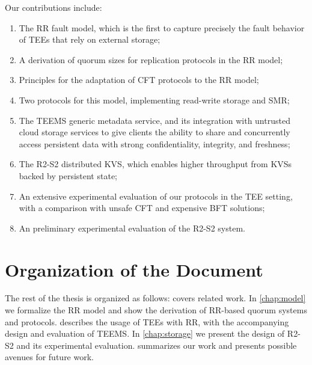 Our contributions include:
\begin{enumerate}
    \item The \ac{RR} fault model, which is the first to capture
        precisely the fault behavior of \acp{TEE} that rely on external storage;
    \item A derivation of quorum sizes for replication protocols
        in the \ac{RR} model;
    \item Principles for the adaptation of \ac{CFT} protocols to
        the \ac{RR} model;
    \item Two protocols for this model, implementing read-write
        storage and \ac{SMR};
    \item The \ac{TEEMS} generic metadata service, and its integration with
        untrusted cloud storage services to give clients the ability to share
        and concurrently access persistent data with strong confidentiality,
        integrity, and freshness;
    \item The \ac{R2-S2} distributed \ac{KVS}, which
        enables higher throughput from \acp{KVS} backed by
        persistent state;
    \item An extensive experimental evaluation of our protocols
        in the \ac{TEE} setting, with a  comparison with
        unsafe \ac{CFT} and expensive \ac{BFT} solutions;
    \item An preliminary experimental evaluation of the \ac{R2-S2}
        system.
\end{enumerate}


\section{Organization of the Document}

The rest of the thesis is organized as follows:
 covers related work. In \cref{chap:model} we
formalize the \ac{RR} model and show the derivation of
\ac{RR}-based quorum systems and protocols. 
describes the usage of \acp{TEE} with \ac{RR}, with the
accompanying design and evaluation of \ac{TEEMS}. In
\cref{chap:storage} we present the design of
\ac{R2-S2} and its experimental evaluation.
 summarizes our work and presents possible
avenues for future work.



